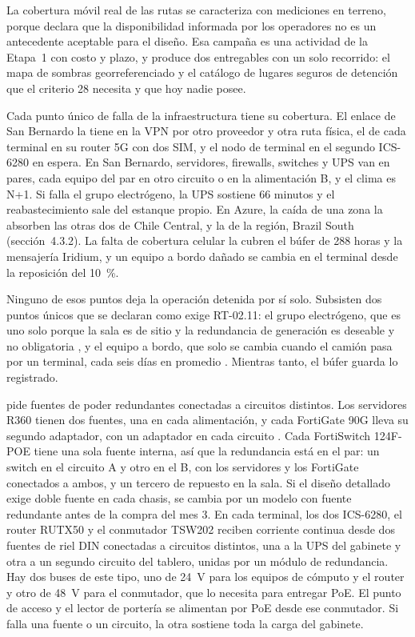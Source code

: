 La cobertura móvil real de las rutas se caracteriza con mediciones en terreno, porque
 declara que la disponibilidad informada por los operadores no es un antecedente
aceptable para el diseño. Esa campaña es una actividad de la Etapa~1 con costo y plazo, y produce dos
entregables con un solo recorrido: el mapa de sombras georreferenciado y el catálogo de lugares seguros
de detención que el criterio 28 necesita y que hoy nadie posee. 

Cada punto único de falla de la infraestructura tiene su cobertura. El enlace de San Bernardo la tiene
en la VPN por otro proveedor y otra ruta física, el de cada terminal en su router 5G con dos SIM, y el
nodo de terminal en el segundo ICS-6280 en espera. En San Bernardo, servidores, firewalls, switches y
UPS van en pares, cada equipo del par en otro circuito o en la alimentación B, y el clima es N+1. Si
falla el grupo electrógeno, la UPS sostiene 66 minutos y el reabastecimiento sale del estanque propio.
En Azure, la caída de una zona la absorben las otras dos de Chile Central, y la de la región, Brazil
South (sección~4.3.2). La falta de cobertura celular la cubren el búfer de 288 horas y la mensajería
Iridium, y un equipo a bordo dañado se cambia en el terminal desde la reposición del 10~\%.

Ninguno de esos puntos deja la operación detenida por sí solo. Subsisten dos puntos únicos que se
declaran como exige RT-02.11: el grupo electrógeno, que es uno solo porque la sala es de sitio y la
redundancia de generación es deseable y no obligatoria , y el equipo a bordo,
que solo se cambia cuando el camión pasa por un terminal, cada seis días en promedio
. Mientras tanto, el búfer guarda lo registrado.

 pide fuentes de poder redundantes conectadas a circuitos distintos. Los servidores
R360 tienen dos fuentes, una en cada alimentación, y cada FortiGate 90G lleva su segundo adaptador, con
un adaptador en cada circuito \parencite{fortinet_fg90g}. Cada FortiSwitch 124F-POE tiene una sola
fuente interna, así que la redundancia está en el par: un switch en el circuito A y otro en el B, con
los servidores y los FortiGate conectados a ambos, y un tercero de repuesto en la sala. Si el diseño
detallado exige doble fuente en cada chasis, se cambia por un modelo con fuente redundante antes de la
compra del mes 3. En cada terminal, los dos ICS-6280, el router
RUTX50 y el conmutador TSW202 reciben corriente continua desde dos fuentes de riel DIN conectadas a
circuitos distintos, una a la UPS del gabinete y otra a un segundo circuito del tablero, unidas por un
módulo de redundancia. Hay dos buses de este tipo, uno de 24~V para los equipos de cómputo y el router y
otro de 48~V para el conmutador, que lo necesita para entregar PoE. El punto de acceso y el lector de
portería se alimentan por PoE desde ese conmutador. Si falla una fuente o un circuito, la otra sostiene
toda la carga del gabinete.

